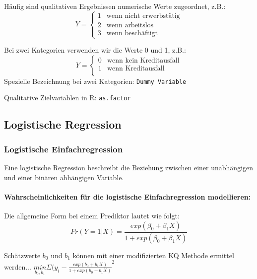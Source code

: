\documentclass[a3paper, 8pt]{extarticle}
\begin{document}
\begin{multicols*}{5}
\begin{enumerate}
Häufig sind qualitativen Ergebnissen numerische Werte zugeordnet, z.B.:
$$Y=\begin{cases}
    1 &\text{wenn nicht erwerbstätig}\\
    2 &\text{wenn arbeitslos}\\
    3 &\text{wenn beschäftigt}
\end{cases}$$

Bei zwei Kategorien verwenden wir die Werte 0 und 1, z.B.:
$$Y=\begin{cases}
    0 &\text{wenn kein Kreditausfall}\\
    1 &\text{wenn Kreditausfall}\\
\end{cases}$$
Spezielle Bezeichnung bei zwei Kategorien: \texttt{Dummy Variable}

Qualitative Zielvariablen in R: \texttt{as.factor}

\subsection{Logistische Regression}

\subsubsection{Logistische Einfachregression}
Eine logistische Regression beschreibt die Beziehung zwischen einer unabhängigen und einer binären abhängigen Variable.

\paragraph{Wahrscheinlichkeiten für die logistische Einfachregression modellieren:} Die allgemeine Form bei einem Prediktor lautet wie folgt: $$Pr(Y=1|X)=\frac{exp(\beta_0+\beta_1X)}{1+ exp(\beta_0+\beta_1X)}$$

Schätzwerte $b_0$ und $b_1$ können mit einer modifizierten KQ Methode ermittel werden... $\underset{b_0,b_1}{min}\Sigma(y_i-\frac{exp(b_0+b_1X)}{1+exp(b_0+b_1X)}^2$



\end{enumerate}
\end{multicols*}
\end{document}
